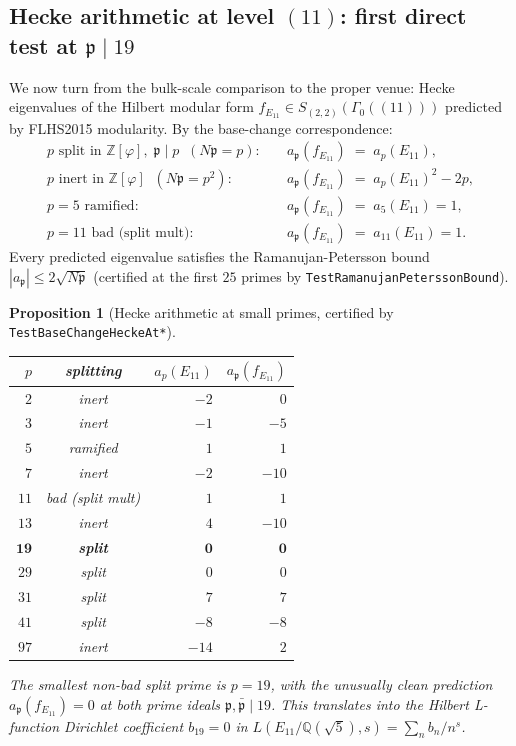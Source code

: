 \documentclass[11pt,a4paper]{article}
\theoremstyle{plain}
\newtheorem{proposition}[theorem]{Proposition}
\theoremstyle{definition}
\theoremstyle{remark}
\numberwithin{equation}{section}
\providecommand{\Zp}{\ensuremath{\mathbb{Z}[\varphi]}}
\providecommand{\Qp}{\ensuremath{\mathbb{Q}(\sqrt{5})}}
\begin{document}
\subsection*{Hecke arithmetic at level $(11)$: first direct test at $\mathfrak p\mid 19$}
\label{sec:hecke-test}

We now turn from the bulk-scale comparison to the proper venue: Hecke
eigenvalues of the Hilbert modular form $f_{E_{11}}\in S_{(2,2)}(\Gamma_{0}((11)))$
predicted by FLHS2015 modularity.  By the base-change correspondence:
\begin{align*}
  p \text{ split in } \Zp,\;\mathfrak p\mid p\;\;(N\mathfrak p=p):
  &\quad a_{\mathfrak p}(f_{E_{11}}) \;=\; a_{p}(E_{11}),\\
  p \text{ inert in } \Zp\;\;(N\mathfrak p=p^{2}):
  &\quad a_{\mathfrak p}(f_{E_{11}}) \;=\; a_{p}(E_{11})^{2}-2p,\\
  p=5 \text{ ramified}:\quad &\quad a_{\mathfrak p}(f_{E_{11}})\;=\;a_{5}(E_{11})=1,\\
  p=11 \text{ bad (split mult)}:\quad &\quad a_{\mathfrak p}(f_{E_{11}})\;=\;a_{11}(E_{11})=1.
\end{align*}
Every predicted eigenvalue satisfies the Ramanujan-Petersson bound
$|a_{\mathfrak p}|\le 2\sqrt{N\mathfrak p}$ (certified at the first $25$ primes
by \texttt{TestRamanujanPeterssonBound}).

\begin{proposition}[Hecke arithmetic at small primes, certified by \texttt{TestBaseChangeHeckeAt*}]
\label{prop:hecke-arithmetic}
\hfill
\begin{center}
\begin{tabular}{@{}rcrr@{}}\hline
$p$ & splitting & $a_{p}(E_{11})$ & $a_{\mathfrak p}(f_{E_{11}})$ \\\hline
$2$  & inert    & $-2$  & $\;\;0$  \\
$3$  & inert    & $-1$  & $-5$ \\
$5$  & ramified & $1$   & $1$  \\
$7$  & inert    & $-2$  & $-10$ \\
$11$ & bad (split mult) & $1$ & $1$ \\
$13$ & inert    & $4$   & $-10$ \\
$\mathbf{19}$ & \textbf{split} & $\mathbf{0}$ & $\mathbf{0}$ \\
$29$ & split    & $0$   & $0$ \\
$31$ & split    & $7$   & $7$ \\
$41$ & split    & $-8$  & $-8$ \\
$97$ & inert    & $-14$ & $2$ \\\hline
\end{tabular}
\end{center}
The smallest non-bad split prime is $p=19$, with the unusually clean
prediction $a_{\mathfrak p}(f_{E_{11}})=0$ at both prime ideals
$\mathfrak p,\bar{\mathfrak p}\mid 19$.  This translates into the Hilbert
L-function Dirichlet coefficient $b_{19}=0$ in $L(E_{11}/\Qp,s)=\sum_{n}b_{n}/n^{s}$.
\end{proposition}
\end{document}

